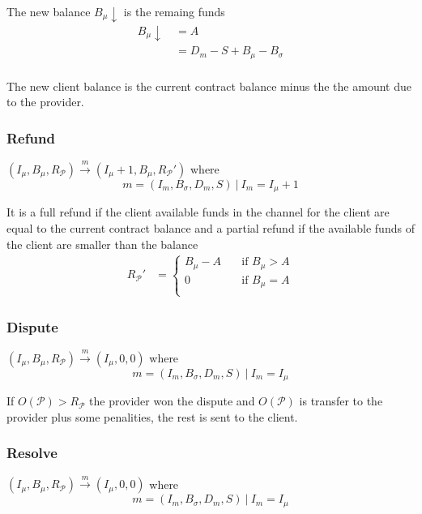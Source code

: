 \documentclass{llncs}
\begin{document}
The new balance $B_\mu\downarrow$ is the remaing funds
\begin{equation*}
\begin{split}
    B_\mu\downarrow \ &= A \\
    &= D_m - S + B_\mu - B_\sigma \\
\end{split}
\end{equation*}

The new client balance is the current contract balance minus the the amount due to the provider.

\subsubsection{Refund} $(I_\mu, B_\mu,R_\mathcal{P}) \xrightarrow{m} (I_\mu+1, B_\mu, R_\mathcal{P}')$ where
$$m = (I_m, B_\sigma, D_m, S)\ |\ I_m = I_\mu+1$$

It is a full refund if the client available funds in the channel for the client are equal to the current contract balance and a partial refund if the available funds of the client are smaller than the balance
\begin{equation*}
\begin{split}
    R_\mathcal{P}' &=
  \begin{cases}
      B_\mu - A & \quad \text{if } B_\mu > A \\
      0 & \quad \text{if } B_\mu = A \\
  \end{cases}
\end{split}
\end{equation*}

\subsubsection{Dispute} $(I_\mu, B_\mu,R_\mathcal{P}) \xrightarrow{m} (I_\mu, 0, 0)$ where
$$m = (I_m, B_\sigma, D_m, S)\ |\ I_m = I_\mu$$

If $O(\mathcal{P}) > R_\mathcal{P}$ the provider won the dispute and $O(\mathcal{P})$ is transfer to the provider plus some penalities, the rest is sent to the client.

\subsubsection{Resolve} $(I_\mu, B_\mu,R_\mathcal{P}) \xrightarrow{m} (I_\mu, 0, 0)$ where
$$m = (I_m, B_\sigma, D_m, S)\ |\ I_m = I_\mu$$
\end{document}
